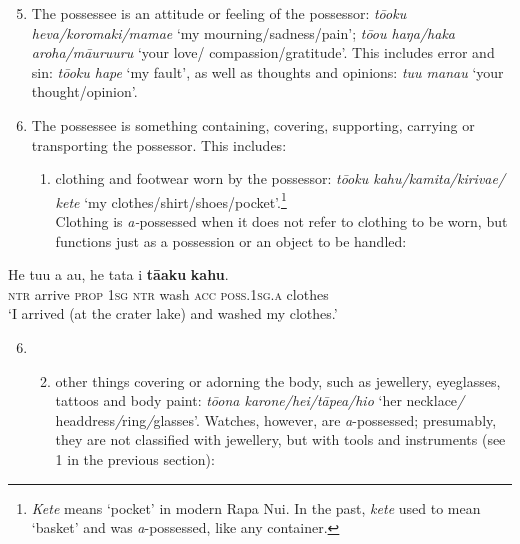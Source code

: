 \begin{enumerate}
\setcounter{enumi}{4} 
\item 
The possessee is an attitude or feeling of the possessor: \textit{\mbox{tō{\ꞌ}oku} heva/koromaki/ma\-mae} ‘my mourning/sadness/pain’; \textit{\mbox{tō{\ꞌ}ou} haŋa/haka {\ꞌ}aroha/māuruuru} ‘your love/ compassion/gratitude’. This includes error and sin: \textit{tō{\ꞌ}oku hape} ‘my fault’, as well as thoughts and opinions: \textit{tu{\ꞌ}u mana{\ꞌ}u} ‘your thought/opinion’.

\item 
The possessee is something containing, covering, supporting, carrying or transporting the possessor. This includes:

\begin{enumerate}
\item 
clothing and footwear worn by the possessor: \textit{tō{\ꞌ}oku kahu/kamita/\mbox{kiriva{\ꞌ}e}/ kete} ‘my clothes/shirt/shoes/pocket’.\footnote{\label{fn:300}\textit{Kete} means ‘pocket’ in modern Rapa Nui. In the past, \textit{kete} used to mean ‘basket’ and was \textit{a}{}-possessed, like any container.}\\
Clothing is \textit{a-}possessed when it does not refer to clothing to be worn, but functions just as a possession or an object to be handled:

\end{enumerate}
\end{enumerate}

\ea\label{ex:6.84}
\gll He tu{\ꞌ}u a au, he tata i \textbf{tā{\ꞌ}aku} \textbf{kahu}. \\
\textsc{ntr} arrive \textsc{prop} \textsc{1sg} \textsc{ntr} wash \textsc{acc} \textsc{poss.1sg.a} clothes \\

\glt
‘I arrived (at the crater lake) and washed my clothes.’ \textstyleExampleref{[R623.011]} 
\z

\begin{enumerate}
\setcounter{enumi}{5}
\item[]
\begin{enumerate}
\setcounter{enumii}{1}
\item 
other things covering or adorning the body, such as jewellery, eyeglasses, tattoos and body paint: \textit{tō{\ꞌ}ona karone/hei/tāpe{\ꞌ}a/hi{\ꞌ}o} ‘her necklace\textit{/} headdress\textit{/}ring\textit{/}glasses’. Watches, however, are \textit{a}{}-possessed; presumably, they are not classified with jewellery, but with tools and instruments (see 1 in the previous section):

\end{enumerate}
\end{enumerate}

